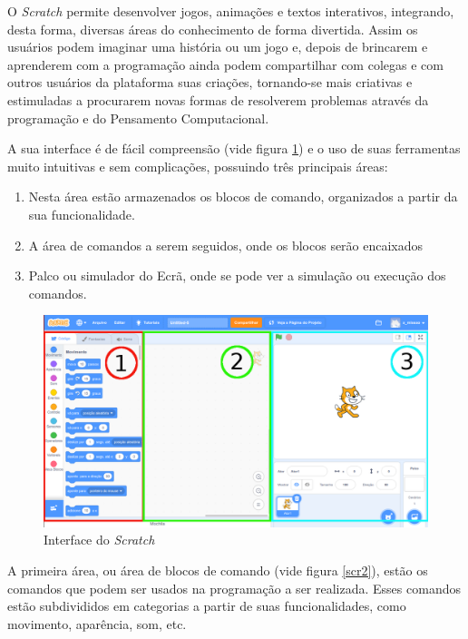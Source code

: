 \documentclass[12pt, openright, a4paper, brazil, english, french, spanish, bibjustif, openany, oneside]{abntex2}
\begin{document}
O \textit{Scratch} permite desenvolver jogos, animações e textos interativos, integrando, desta forma, diversas áreas do conhecimento de forma divertida. Assim os usuários podem imaginar uma história ou um jogo e, depois de brincarem e aprenderem com a programação ainda podem compartilhar com colegas e com outros usuários da plataforma suas criações, tornando-se mais criativas e estimuladas a procurarem novas formas de resolverem problemas através da programação e do Pensamento Computacional. 

 
A sua interface é de fácil compreensão (vide figura \ref{scr1}) e o uso de suas ferramentas muito intuitivas e sem complicações, possuindo três principais áreas:
 
\begin{enumerate}
\item Nesta área estão armazenados os blocos de comando, organizados a partir da sua funcionalidade.
\item A área de comandos a serem seguidos, onde os blocos serão encaixados
\item Palco ou simulador do Ecrã, onde se pode ver a simulação ou execução dos comandos.
\end{enumerate}

\begin{figure}[H]

    \center
    \caption{Interface do \textit{Scratch} \label{scr1}}
    \includegraphics[width=13cm]{scratch1.png}
    
\end{figure}


A primeira área, ou área de blocos de comando (vide figura \ref{scr2}), estão os comandos que podem ser usados na programação a ser realizada. Esses comandos estão subdivididos em categorias a partir de suas funcionalidades, como movimento, aparência, som, etc.
\end{document}
